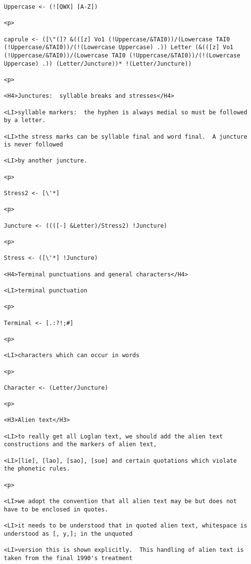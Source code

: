 \documentclass[12pt]{article}
\begin{document}
\begin{lstlisting}
Uppercase <- (![QWX] [A-Z])

<p>

caprule <- ([\"(]? &(([z] Vo1 (!Uppercase/&TAI0))/(Lowercase TAI0 (!Uppercase/&TAI0))/(!(Lowercase Uppercase) .)) Letter (&(([z] Vo1 (!Uppercase/&TAI0))/(Lowercase TAI0 (!Uppercase/&TAI0))/(!(Lowercase Uppercase) .)) (Letter/Juncture))* !(Letter/Juncture))

<p>

<H4>Junctures:  syllable breaks and stresses</H4>

<LI>syllable markers:  the hyphen is always medial so must be followed by a letter.

<LI>the stress marks can be syllable final and word final.  A juncture is never followed

<LI>by another juncture.

<p>

Stress2 <- [\'*]

<p>

Juncture <- ((([-] &Letter)/Stress2) !Juncture)

<p>

Stress <- ([\'*] !Juncture)

<H4>Terminal punctuations and general characters</H4>

<LI>terminal punctuation

<p>

Terminal <- [.:?!;#]

<p>

<LI>characters which can occur in words

<p>

Character <- (Letter/Juncture)

<p>

<H3>Alien text</H3>

<LI>to really get all Loglan text, we should add the alien text constructions and the markers of alien text,

<LI>[lie], [lao], [sao], [sue] and certain quotations which violate the phonetic rules.

<p>

<LI>we adopt the convention that all alien text may be but does not have to be enclosed in quotes.

<LI>it needs to be understood that in quoted alien text, whitespace is understood as [, y,]; in the unquoted

<LI>version this is shown explicitly.  This handling of alien text is taken from the final 1990's treatment


\end{lstlisting}
\end{document}
